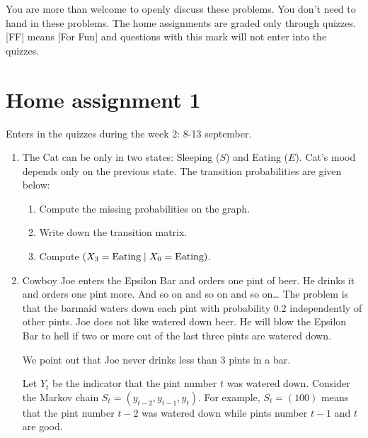 \documentclass[12pt]{article}
\let\P\relax
\DeclareMathOperator{\P}{\mathbb{P}}
\begin{document}
You are more than welcome to openly discuss these problems. 
You don't need to hand in these problems.
The home assignments are graded only through quizzes. 
[FF] means [For Fun] and questions with this mark will not enter into the quizzes. 

\section*{Home assignment 1}

Enters in the quizzes during the week 2: 8-13 september. 

\begin{enumerate}
\item The Cat can be only in two states: Sleeping ($S$) and Eating ($E$). 
Cat's mood depends only on the previous state. 
The transition probabilities are given below:



\begin{enumerate}
    \item Compute the missing probabilities on the graph.
    \item Write down the transition matrix.
    \item Compute $\P(X_3 = \text{Eating} \mid X_0 = \text{Eating})$.
\end{enumerate}

\item Cowboy Joe enters the Epsilon Bar and orders one pint of beer. 
He drinks it and orders one pint more. 
And so on and so on and so on\dots{ }
The problem is that the barmaid waters down each pint with probability $0.2$ independently of other pints.
Joe does not like watered down beer. 
He will blow the Epsilon Bar to hell if two or more out of the last three pints are watered down. 

We point out that Joe never drinks less than 3 pints in a bar. 

Let $Y_t$ be the indicator that the pint number $t$ was watered down. 
Consider the Markov chain $S_t = (y_{t-2}, y_{t-1}, y_t)$.
For example, $S_t = (100)$ means that the pint number $t-2$ was watered down while pints number $t-1$ and $t$ are good. 


\end{enumerate}
\end{document}

